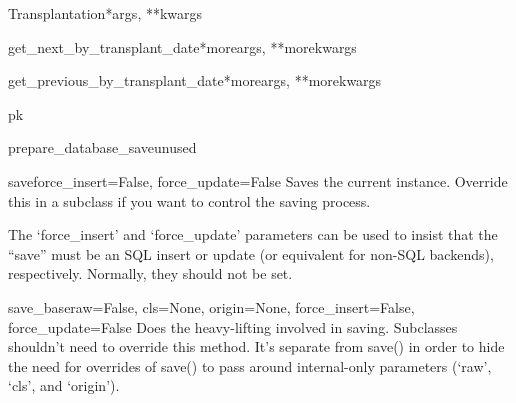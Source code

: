 \documentclass[letterpaper,10pt,english]{sphinxmanual}
\begin{document}
\begin{classdesc}{Transplantation}{*args, **kwargs}
\hypertarget{data.models.Transplantation.get_next_by_transplant_date}{}\begin{methoddesc}[Transplantation]{get\_next\_by\_transplant\_date}{*moreargs, **morekwargs}\end{methoddesc}

\hypertarget{data.models.Transplantation.get_previous_by_transplant_date}{}\begin{methoddesc}[Transplantation]{get\_previous\_by\_transplant\_date}{*moreargs, **morekwargs}\end{methoddesc}

\hypertarget{data.models.Transplantation.pk}{}\begin{memberdesc}[Transplantation]{pk}\end{memberdesc}

\hypertarget{data.models.Transplantation.prepare_database_save}{}\begin{methoddesc}[Transplantation]{prepare\_database\_save}{unused}\end{methoddesc}

\hypertarget{data.models.Transplantation.save}{}\begin{methoddesc}[Transplantation]{save}{force\_insert=False, force\_update=False}
Saves the current instance. Override this in a subclass if you want to
control the saving process.

The `force\_insert' and `force\_update' parameters can be used to insist
that the ``save'' must be an SQL insert or update (or equivalent for
non-SQL backends), respectively. Normally, they should not be set.
\end{methoddesc}

\hypertarget{data.models.Transplantation.save_base}{}\begin{methoddesc}[Transplantation]{save\_base}{raw=False, cls=None, origin=None, force\_insert=False, force\_update=False}
Does the heavy-lifting involved in saving. Subclasses shouldn't need to
override this method. It's separate from save() in order to hide the
need for overrides of save() to pass around internal-only parameters
(`raw', `cls', and `origin').
\end{methoddesc}


\end{classdesc}
\end{document}

